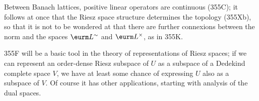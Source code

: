 {Between Banach lattices, positive linear operators are continuous
(355C);  it follows at once that the Riesz space structure determines
the topology (355Xb), so that it is not to be wondered at that there are
further connexions between the norm and the spaces $\eurm L^{\sim}$ and
$\eurm L^{\times}$, as in 355K.

355F will be a basic tool in the theory of representations of Riesz
spaces;  if we can represent an order-dense Riesz subspace of $U$ as a
subspace of a Dedekind complete space $V$, we have at least some chance
of expressing $U$ also as a subspace of $V$.   Of course it has other
applications, starting with analysis of the dual spaces.
}%

\discrpage

